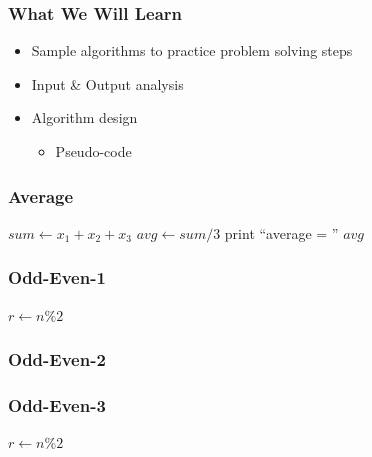 \documentclass{../c-lecture}
\subtitle{Algorithm Design}
\begin{document}
\begin{frame}
  \titlepage{}
\end{frame}

\begin{frame}
  \frametitle{What We Will Learn}
  \begin{itemize}
    \item Sample algorithms to practice problem solving steps
    \item Input \& Output analysis
    \item Algorithm design
    \begin{itemize}
      \item Pseudo-code
    \end{itemize}
  \end{itemize}
\end{frame}

\begin{frame}
  \frametitle{Average}
  \begin{algorithm}[H]
  $sum \gets x_1 + x_2 + x_3$\;
  $avg \gets sum / 3$\;
  print ``average = '' $avg$ \;
  \end{algorithm}
\end{frame}

\begin{frame}
  \frametitle{Odd-Even-1}
  \begin{algorithm}[H]
  $r \gets n \% 2$\;
  \end{algorithm}
\end{frame}

\begin{frame}
  \frametitle{Odd-Even-2}
  \begin{algorithm}[H]
  \end{algorithm}
\end{frame}

\begin{frame}
  \frametitle{Odd-Even-3}
  \begin{algorithm}[H]
  $r \gets n \% 2$\;
  \end{algorithm}
\end{frame}
\end{document}
